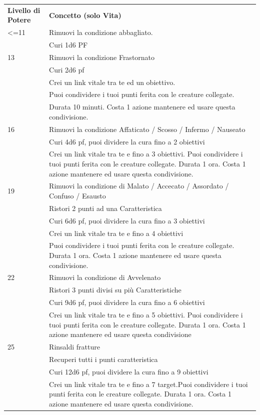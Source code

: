 \documentclass[a4paper,10 pt,twoside,openany]{book}
\begin{document}
\begin{tabularx}{0.95\textwidth}{lX}
	\toprule
	\textbf{Livello di Potere} & \textbf{Concetto (solo Vita)}\\
	<=11   & Rimuovi la condizione abbagliato. \\
	& Curi 1d6 PF \\
	13     & Rimuovi la condizione Frastornato \\
	& Curi 2d6 pf \\
	& Crei un link vitale tra te ed un obiettivo. \\
	& Puoi condividere i tuoi punti ferita con le creature collegate. \\
	& Durata 10 minuti. Costa 1 azione mantenere ed usare questa condivisione. \\
	16     & Rimuovi la condizione Affaticato / Scosso / Infermo / Nauseato \\
	& Curi 4d6 pf, puoi dividere la cura fino a 2 obiettivi \\
	& Crei un link vitale tra te e fino a 3 obiettivi. Puoi condividere i tuoi punti ferita con le creature collegate. Durata 1 ora. Costa 1 azione mantenere ed usare questa condivisione. \\
	19     & Rimuovi la condizione di Malato / Accecato / Assordato / Confuso / Esausto \\
	& Ristori 2 punti ad una Caratteristica\\
	& Curi 6d6 pf, puoi dividere la cura fino a 3 obiettivi\\
	& Crei un link vitale tra te e fino a 4 obiettivi\\
	& Puoi condividere i tuoi punti ferita con le creature collegate. Durata 1 ora. Costa 1 azione mantenere ed usare questa condivisione. \\
	22     & Rimuovi la condizione di Avvelenato\\
	& Ristori 3 punti divisi su più Caratteristiche \\
	& Curi 9d6 pf, puoi dividere la cura fino a 6 obiettivi\\
	& Crei un link vitale tra te e fino a 5 obiettivi. Puoi condividere i tuoi punti ferita con le creature collegate. Durata 1 ora. Costa 1 azione mantenere ed usare questa condivisione \\
	25     & Rinsaldi fratture\\
	& Recuperi tutti i punti caratteristica \\
	& Curi 12d6 pf, puoi dividere la cura fino a 9 obiettivi \\
	& Crei un link vitale tra te e fino a 7 target.Puoi condividere i tuoi punti ferita con le creature collegate. Durata 1 ora. Costa 1 azione mantenere ed usare questa condivisione.  \\

\end{tabularx}
\end{document}
